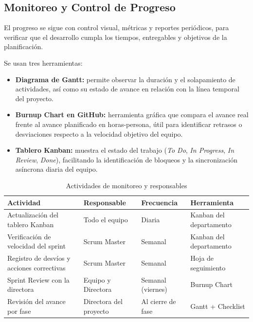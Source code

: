 \documentclass{article}
\begin{document}
\subsection{Monitoreo y Control de Progreso}

El progreso se sigue con control visual, métricas y reportes periódicos, para
verificar que el desarrollo cumpla los tiempos, entregables y objetivos de la
planificación.

Se usan tres herramientas:

\begin{itemize}
    \item \textbf{Diagrama de Gantt:} permite observar la duración y el
    solapamiento de actividades, así como su estado de avance en relación
    con la línea temporal del proyecto.

    \item \textbf{Burnup Chart en GitHub:} herramienta gráfica que compara
    el avance real frente al avance planificado en horas-persona, útil para
    identificar retrasos o desviaciones respecto a la velocidad objetivo del equipo.

    \item \textbf{Tablero Kanban:} muestra el estado del
    trabajo (\textit{To Do}, \textit{In Progress}, \textit{In Review},
    \textit{Done}), facilitando la identificación de bloqueos y la
    sincronización asíncrona diaria del equipo.
\end{itemize}

\begin{table}[H]
\centering
\small
\begin{tabular}{|p{4.5cm}|p{3cm}|p{2.5cm}|p{3.5cm}|}
\hline
\textbf{Actividad} & \textbf{Responsable} & \textbf{Frecuencia} & \textbf{Herramienta} \\ \hline

Actualización del tablero Kanban & Todo el equipo & Diaria & Kanban del departamento \\ \hline

Verificación de velocidad del sprint &  Scrum Master & Semanal & Kanban del departamento \\ \hline

Registro de desvíos y acciones correctivas & Scrum Master & Semanal & Hoja de seguimiento \\ \hline

Sprint Review con la directora & Equipo y Directora & Semanal (viernes) & Burnup Chart \\ \hline

Revisión del avance por fase & Directora del proyecto & Al cierre de fase & Gantt + Checklist \\ \hline

\end{tabular}
\caption{Actividades de monitoreo y responsables}
\label{tab:monitoreo_control}
\end{table}
\end{document}
